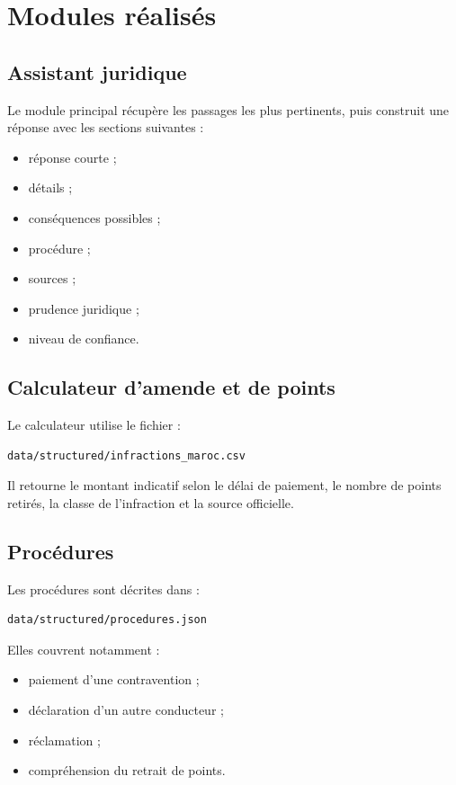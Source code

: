 \documentclass[12pt,a4paper]{article}
\begin{document}
\section{Modules réalisés}

\subsection{Assistant juridique}

Le module principal récupère les passages les plus pertinents, puis construit une réponse
avec les sections suivantes :

\begin{itemize}[leftmargin=1.2cm]
    \item réponse courte ;
    \item détails ;
    \item conséquences possibles ;
    \item procédure ;
    \item sources ;
    \item prudence juridique ;
    \item niveau de confiance.
\end{itemize}

\subsection{Calculateur d'amende et de points}

Le calculateur utilise le fichier :

\begin{lstlisting}
data/structured/infractions_maroc.csv
\end{lstlisting}

Il retourne le montant indicatif selon le délai de paiement, le nombre de points retirés,
la classe de l'infraction et la source officielle.

\subsection{Procédures}

Les procédures sont décrites dans :

\begin{lstlisting}
data/structured/procedures.json
\end{lstlisting}

Elles couvrent notamment :

\begin{itemize}[leftmargin=1.2cm]
    \item paiement d'une contravention ;
    \item déclaration d'un autre conducteur ;
    \item réclamation ;
    \item compréhension du retrait de points.
\end{itemize}
\end{document}

